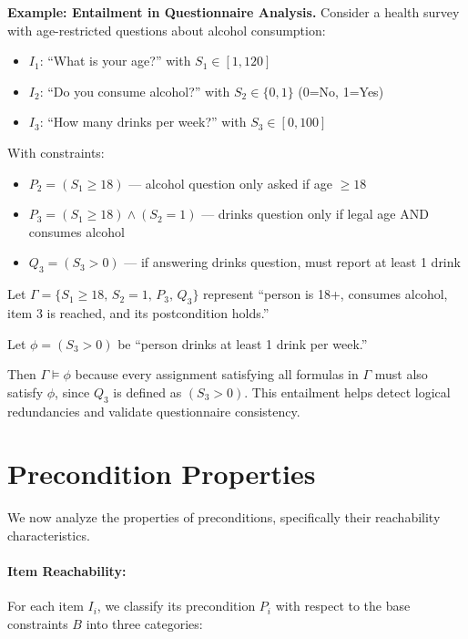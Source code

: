\begin{mdframed}
\noindent\textbf{Example: Entailment in Questionnaire Analysis.} Consider a health survey with age-restricted questions about alcohol consumption:
\begin{itemize}
    \item $I_1$: ``What is your age?'' with $S_1 \in [1, 120]$
    \item $I_2$: ``Do you consume alcohol?'' with $S_2 \in \{0, 1\}$ (0=No, 1=Yes)
    \item $I_3$: ``How many drinks per week?'' with $S_3 \in [0, 100]$
\end{itemize}

With constraints:
\begin{itemize}
    \item $P_2 = (S_1 \geq 18)$ — alcohol question only asked if age $\geq 18$
    \item $P_3 = (S_1 \geq 18) \land (S_2 = 1)$ — drinks question only if legal age AND consumes alcohol
    \item $Q_3 = (S_3 > 0)$ — if answering drinks question, must report at least 1 drink
\end{itemize}

Let $\Gamma = \{S_1 \geq 18,\, S_2 = 1,\, P_3,\, Q_3\}$ represent ``person is 18+, consumes alcohol, item 3 is reached, and its postcondition holds.''

Let $\phi = (S_3 > 0)$ be ``person drinks at least 1 drink per week.''

Then $\Gamma \models \phi$ because every assignment satisfying all formulas in $\Gamma$ must also satisfy $\phi$, since $Q_3$ is defined as $(S_3 > 0)$. This entailment helps detect logical redundancies and validate questionnaire consistency.
\end{mdframed}

\section{Precondition Properties}

We now analyze the properties of preconditions, specifically their reachability characteristics.

\paragraph{Item Reachability:}

For each item $I_i$, we classify its precondition $P_i$ with respect to the base constraints $B$ into three categories:


